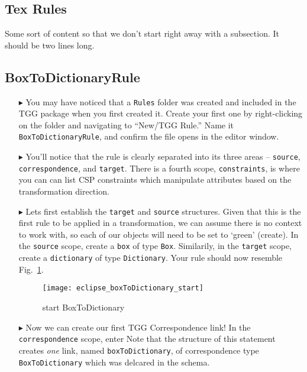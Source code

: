 \newpage
\hypertarget{rules tex}{}
\subsection{Tex Rules}
\texHeader

Some sort of content so that we don't start right away with a subsection. It should be two lines long.

\subsection{BoxToDictionaryRule}

\begin{itemize}

\item[$\blacktriangleright$] You may have noticed that a \texttt{Rules} folder was created and included in the TGG package when you first created it. Create
your first one by right-clicking on the folder and navigating to ``New/TGG Rule.'' Name it \texttt{BoxToDictionaryRule}, and confirm the file opens in the
editor window.

\item[$\blacktriangleright$] You'll notice that the rule is clearly separated into its three areas -- \texttt{source}, \texttt{correspondence}, and
\texttt{target}. There is a fourth scope, \texttt{constraints}, is where you can can list CSP constraints which manipulate attributes based on the
transformation direction. 

\item[$\blacktriangleright$] Lets first establish the \texttt{target} and \texttt{source} structures. Given that this is the first rule to be applied in a
transformation, we can assume there is no context to work with, so each of our objects will need to be set to `green' (create). In the \texttt{source} scope,
create a \texttt{box} of type \texttt{Box}. Similarily, in the \texttt{target} scope, create a \texttt{dictionary} of type \texttt{Dictionary}. Your rule
should now resemble Fig.~\ref{fig:textSourceRule}.

\vspace{0.5cm}

\begin{figure}[htbp]
\begin{center}
  \texttt{[image: eclipse\_boxToDictionary\_start]}
  \caption{start BoxToDictionary}
  \label{fig:textSourceRule}
\end{center}
\end{figure}

\item[$\blacktriangleright$] Now we can create our first TGG Correspondence link! In the \texttt{correspondence} scope, enter 
Note that the structure of this statement creates \emph{one} link, named \texttt{boxToDictionary}, of correspondence type \texttt{BoxToDictionary} which was
delcared in the schema.

\end{itemize}

